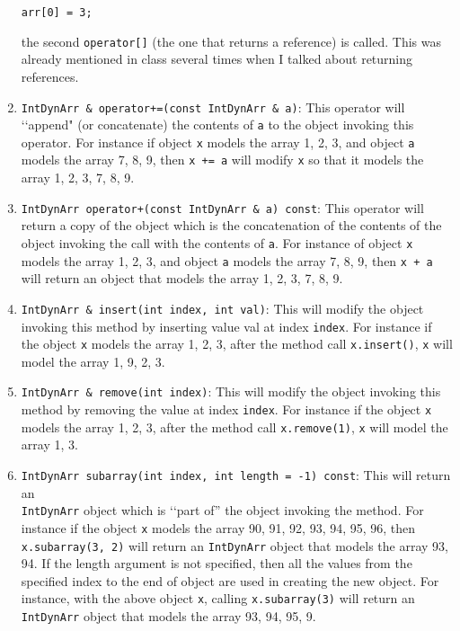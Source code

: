 \begin{enumerate}
\begin{Verbatim}[frame=single]
arr[0] = 3;
\end{Verbatim}

the second \verb!operator[]! (the one that returns a reference) is called. 
This was already mentioned in class several times when I talked about 
returning references.

\item \verb!IntDynArr & operator+=(const IntDynArr & a)!: This operator will 
\lq\lq append" (or concatenate) the contents of \verb!a! to the object invoking this 
operator. For instance if object \verb!x! models the array 1, 2, 3, and object 
\verb!a! models the array 7, 8, 9, then \verb!x += a! will modify \verb!x! so that it 
models the array 1, 2, 3, 7, 8, 9.

\item \verb!IntDynArr operator+(const IntDynArr & a) const!: This operator will 
return a copy of the object which is the concatenation of the contents of the 
object invoking the call with the contents of \verb!a!. For instance of object 
\verb!x! models the array 1, 2, 3, and object \verb!a! models the array 7, 8, 9, then 
\verb!x + a! will return an object that models the array 1, 2, 3, 7, 8, 9.

\item \verb!IntDynArr & insert(int index, int val)!: This will modify the 
object invoking this method by inserting value val at index \verb!index!. 
For instance if the object \verb!x! models the array 1, 2, 3, after the 
method call \texttt{x.insert()}, \verb!x! will model 
the array 1, 9, 2, 3.

\item \verb!IntDynArr & remove(int index)!: This will modify the object 
invoking this method by removing the value at index \verb!index!. For instance 
if the object \verb!x! models the array 1, 2, 3, after the method call 
\verb!x.remove(1)!, \verb!x! will model the array 1, 3.

\item \verb!IntDynArr subarray(int index, int length = -1) const!: This 
will return an \\ \verb!IntDynArr! object which is \lq\lq part of” the object 
invoking the method. For instance if the object \verb!x! models the 
array 90, 91, 92, 93, 94, 95, 96, then \verb!x.subarray(3, 2)! will 
return an \verb!IntDynArr! object that models the array 93, 94. If the 
length argument is not specified, then all the values from the specified 
index to the end of object are used in creating the new object. For 
instance, with the above object \verb!x!, calling  \verb!x.subarray(3)! 
will return an \verb!IntDynArr! object that models the array 93, 94, 95, 9.


\end{enumerate}
